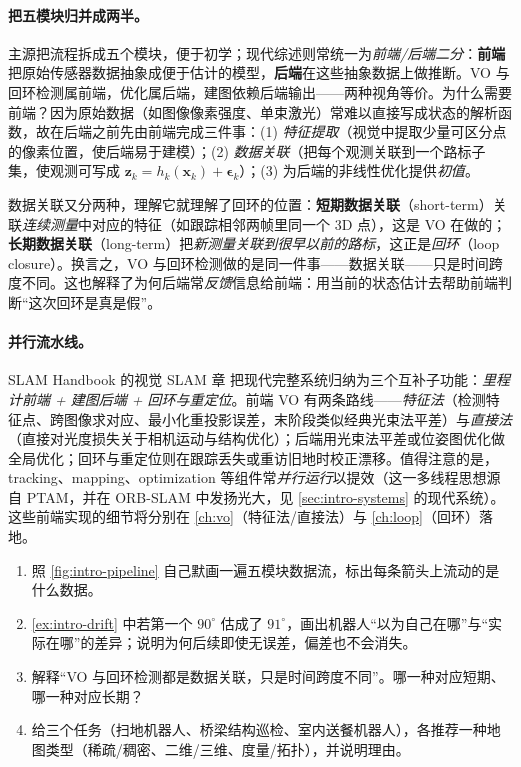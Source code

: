\paragraph{把五模块归并成两半。}
主源把流程拆成五个模块，便于初学；现代综述则常统一为\emph{前端/后端二分}\cite{cadena2016past}：\textbf{前端}把原始传感器数据抽象成便于估计的模型，\textbf{后端}在这些抽象数据上做推断。VO 与回环检测属前端，优化属后端，建图依赖后端输出——两种视角等价。为什么需要前端？因为原始数据（如图像像素强度、单束激光）常难以直接写成状态的解析函数，故在后端之前先由前端完成三件事\cite{cadena2016past}：(1) \emph{特征提取}（视觉中提取少量可区分点的像素位置，使后端易于建模）；(2) \emph{数据关联}（把每个观测关联到一个路标子集，使观测可写成 $\mathbf{z}_k=h_k(\mathbf{x}_k)+\boldsymbol{\epsilon}_k$）；(3) 为后端的非线性优化提供\emph{初值}。

\begin{insight}
数据关联又分两种，理解它就理解了回环的位置\cite{cadena2016past}：\textbf{短期数据关联}（short-term）关联\emph{连续测量}中对应的特征（如跟踪相邻两帧里同一个 3D 点），这是 VO 在做的；\textbf{长期数据关联}（long-term）把\emph{新测量关联到很早以前的路标}，这正是\emph{回环}（loop closure）。换言之，VO 与回环检测做的是同一件事——数据关联——只是时间跨度不同。这也解释了为何后端常\emph{反馈}信息给前端：用当前的状态估计去帮助前端判断“这次回环是真是假”。
\end{insight}

\paragraph{并行流水线。}
SLAM Handbook 的视觉 SLAM 章\cite{carlone2026handbook} 把现代完整系统归纳为三个互补子功能：\emph{里程计前端 + 建图后端 + 回环与重定位}。前端 VO 有两条路线——\emph{特征法}（检测特征点、跨图像求对应、最小化重投影误差，末阶段类似经典光束法平差）与\emph{直接法}（直接对光度损失关于相机运动与结构优化）；后端用光束法平差或位姿图优化做全局优化；回环与重定位则在跟踪丢失或重访旧地时校正漂移。值得注意的是，tracking、mapping、optimization 等组件常\emph{并行运行}以提效（这一多线程思想源自 PTAM，并在 ORB-SLAM 中发扬光大，见 \cref{sec:intro-systems} 的现代系统）。这些前端实现的细节将分别在 \cref{ch:vo}（特征法/直接法）与 \cref{ch:loop}（回环）落地。

\begin{practice}
\begin{enumerate}
  \item 照 \cref{fig:intro-pipeline} 自己默画一遍五模块数据流，标出每条箭头上流动的是什么数据。
  \item \cref{ex:intro-drift} 中若第一个 $90^\circ$ 估成了 $91^\circ$，画出机器人“以为自己在哪”与“实际在哪”的差异；说明为何后续即使无误差，偏差也不会消失。
  \item 解释“VO 与回环检测都是数据关联，只是时间跨度不同”。哪一种对应短期、哪一种对应长期？
  \item 给三个任务（扫地机器人、桥梁结构巡检、室内送餐机器人），各推荐一种地图类型（稀疏/稠密、二维/三维、度量/拓扑），并说明理由。
\end{enumerate}
\end{practice}

